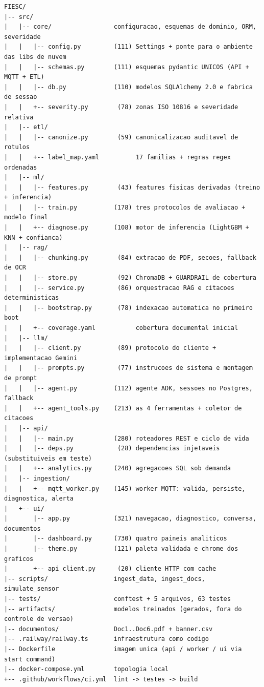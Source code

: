 \begin{lstlisting}[caption={Estrutura do repositório}, label={lst:arvore}]
FIESC/
|-- src/
|   |-- core/                 configuracao, esquemas de dominio, ORM, severidade
|   |   |-- config.py         (111) Settings + ponte para o ambiente das libs de nuvem
|   |   |-- schemas.py        (111) esquemas pydantic UNICOS (API + MQTT + ETL)
|   |   |-- db.py             (110) modelos SQLAlchemy 2.0 e fabrica de sessao
|   |   +-- severity.py        (78) zonas ISO 10816 e severidade relativa
|   |-- etl/
|   |   |-- canonize.py        (59) canonicalizacao auditavel de rotulos
|   |   +-- label_map.yaml          17 familias + regras regex ordenadas
|   |-- ml/
|   |   |-- features.py        (43) features fisicas derivadas (treino + inferencia)
|   |   |-- train.py          (178) tres protocolos de avaliacao + modelo final
|   |   +-- diagnose.py       (108) motor de inferencia (LightGBM + KNN + confianca)
|   |-- rag/
|   |   |-- chunking.py        (84) extracao de PDF, secoes, fallback de OCR
|   |   |-- store.py           (92) ChromaDB + GUARDRAIL de cobertura
|   |   |-- service.py         (86) orquestracao RAG e citacoes deterministicas
|   |   |-- bootstrap.py       (78) indexacao automatica no primeiro boot
|   |   +-- coverage.yaml           cobertura documental inicial
|   |-- llm/
|   |   |-- client.py          (89) protocolo do cliente + implementacao Gemini
|   |   |-- prompts.py         (77) instrucoes de sistema e montagem de prompt
|   |   |-- agent.py          (112) agente ADK, sessoes no Postgres, fallback
|   |   +-- agent_tools.py    (213) as 4 ferramentas + coletor de citacoes
|   |-- api/
|   |   |-- main.py           (280) roteadores REST e ciclo de vida
|   |   |-- deps.py            (28) dependencias injetaveis (substituiveis em teste)
|   |   +-- analytics.py      (240) agregacoes SQL sob demanda
|   |-- ingestion/
|   |   +-- mqtt_worker.py    (145) worker MQTT: valida, persiste, diagnostica, alerta
|   +-- ui/
|       |-- app.py            (321) navegacao, diagnostico, conversa, documentos
|       |-- dashboard.py      (730) quatro paineis analiticos
|       |-- theme.py          (121) paleta validada e chrome dos graficos
|       +-- api_client.py      (20) cliente HTTP com cache
|-- scripts/                  ingest_data, ingest_docs, simulate_sensor
|-- tests/                    conftest + 5 arquivos, 63 testes
|-- artifacts/                modelos treinados (gerados, fora do controle de versao)
|-- documentos/               Doc1..Doc6.pdf + banner.csv
|-- .railway/railway.ts       infraestrutura como codigo
|-- Dockerfile                imagem unica (api / worker / ui via start command)
|-- docker-compose.yml        topologia local
+-- .github/workflows/ci.yml  lint -> testes -> build
\end{lstlisting}

